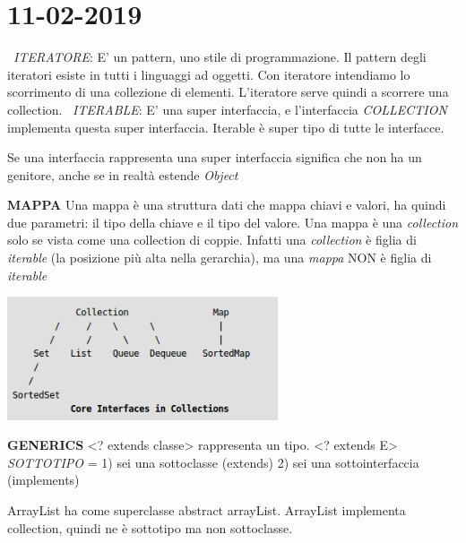 

\newpage
\section{11-02-2019}
\textbullet\  \textit{ITERATORE}: E' un pattern, uno stile di programmazione. Il pattern degli iteratori esiste in tutti i linguaggi ad oggetti. Con iteratore intendiamo lo scorrimento di una collezione di elementi. L'iteratore serve quindi a scorrere una collection.\newline
\textbullet\ \textit{ITERABLE}: E' una super interfaccia, e l'interfaccia \textit{COLLECTION} implementa questa super interfaccia. Iterable è super tipo di tutte le interfacce.

\noindent Se una interfaccia rappresenta una super interfaccia significa che non ha un genitore, anche se in realtà estende \textit{Object}


\noindent \textbf{MAPPA}\newline
Una mappa è una struttura dati che mappa chiavi e valori, ha quindi due parametri: il tipo della chiave e il tipo del valore. Una mappa è una \textit{collection} solo se vista come una collection di coppie. Infatti una \textit{collection} è figlia di \textit{iterable} (la posizione più alta nella gerarchia), ma una \textit{mappa} NON è figlia di \textit{iterable}
\begin{center}
\includegraphics[width=%
0.6\textwidth]{MapInterface}
\end{center} 

\noindent \textbf{GENERICS}\newline
<? extends classe> rappresenta un tipo. \newline
<? extends E> \newline
\textit{SOTTOTIPO} = 1) sei una sottoclasse (extends) 2) sei una sottointerfaccia (implements)
\newline


ArrayList ha come superclasse abstract arrayList. ArrayList implementa collection, quindi ne è sottotipo ma non sottoclasse.
\newline


